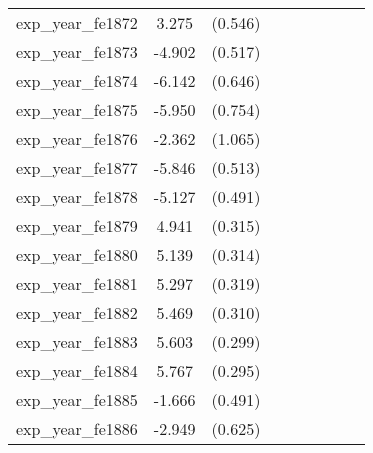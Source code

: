 {\begin{tabular}{l*{4}{cc}}
exp\_year\_fe1872&    3.275\sym{***}&  (0.546)&                  &         &                  &         &                  &         \\
exp\_year\_fe1873&   -4.902\sym{***}&  (0.517)&                  &         &                  &         &                  &         \\
exp\_year\_fe1874&   -6.142\sym{***}&  (0.646)&                  &         &                  &         &                  &         \\
exp\_year\_fe1875&   -5.950\sym{***}&  (0.754)&                  &         &                  &         &                  &         \\
exp\_year\_fe1876&   -2.362\sym{*}  &  (1.065)&                  &         &                  &         &                  &         \\
exp\_year\_fe1877&   -5.846\sym{***}&  (0.513)&                  &         &                  &         &                  &         \\
exp\_year\_fe1878&   -5.127\sym{***}&  (0.491)&                  &         &                  &         &                  &         \\
exp\_year\_fe1879&    4.941\sym{***}&  (0.315)&                  &         &                  &         &                  &         \\
exp\_year\_fe1880&    5.139\sym{***}&  (0.314)&                  &         &                  &         &                  &         \\
exp\_year\_fe1881&    5.297\sym{***}&  (0.319)&                  &         &                  &         &                  &         \\
exp\_year\_fe1882&    5.469\sym{***}&  (0.310)&                  &         &                  &         &                  &         \\
exp\_year\_fe1883&    5.603\sym{***}&  (0.299)&                  &         &                  &         &                  &         \\
exp\_year\_fe1884&    5.767\sym{***}&  (0.295)&                  &         &                  &         &                  &         \\
exp\_year\_fe1885&   -1.666\sym{***}&  (0.491)&                  &         &                  &         &                  &         \\
exp\_year\_fe1886&   -2.949\sym{***}&  (0.625)&                  &         &                  &         &                  &         \\

\end{tabular}}
